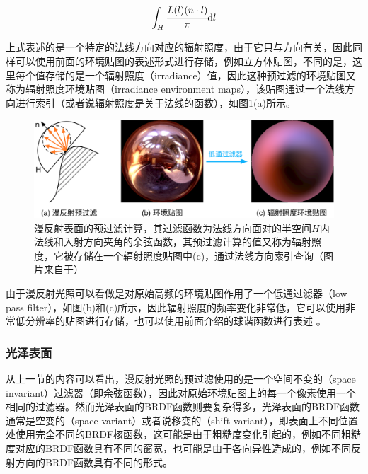 \begin{equation}\label{e:pl-prefiltering-2}
	\int_H \cfrac{L(l)(n\cdot l)}{\pi}{\rm d}l
\end{equation}

上式表述的是一个特定的法线方向对应的辐射照度，由于它只与方向有关，因此同样可以使用前面的环境贴图的表述形式进行存储，例如立方体贴图，不同的是，这里每个值存储的是一个辐射照度（irradiance）值，因此这种预过滤的环境贴图又称为辐射照度环境贴图（irradiance environment maps）\cite{a:IlluminationandReflectionMaps:SimulatedObjectsinSimulatedandRealEnvironments}，该贴图通过一个法线方向进行索引（或者说辐射照度是关于法线的函数），如图\ref{f:pl-f:pl-pl-pre-filtering-2}(a)所示。

\begin{figure}
	\includegraphics[width=\textwidth]{figures/pl/pl-prefiltering-2}
	\caption{漫反射表面的预过滤计算，其过滤函数为法线方向面对的半空间$H$内法线和入射方向夹角的余弦函数，其预过滤计算的值又称为辐射照度，它被存储在一个辐射照度贴图中(c)，通过法线方向索引查询（图片来自于\cite{a:Anefficientrepresentationforirradianceenvironmentmaps}）}
	\label{f:pl-f:pl-pl-pre-filtering-2}
\end{figure}

由于漫反射光照可以看做是对原始高频的环境贴图作用了一个低通过滤器（low pass filter），如图\cite{f:pl-f:pl-pl-pre-filtering-2}(b)和(c)所示，因此辐射照度的频率变化非常低，它可以使用非常低分辨率的贴图进行存储，也可以使用前面介绍的球谐函数进行表述 \cite{a:Anefficientrepresentationforirradianceenvironmentmaps}。



\subsubsection{光泽表面}
从上一节的内容可以看出，漫反射光照的预过滤使用的是一个空间不变的（space invariant）过滤器（即余弦函数），因此对原始环境贴图上的每一个像素使用一个相同的过滤器。然而光泽表面的BRDF函数则要复杂得多，光泽表面的BRDF函数通常是空变的（space variant）或者说移变的（shift variant），即表面上不同位置处使用完全不同的BRDF核函数，这可能是由于粗糙度变化引起的，例如不同粗糙度对应的BRDF函数具有不同的窗宽，也可能是由于各向异性造成的，例如不同反射方向的BRDF函数具有不同的形式。

